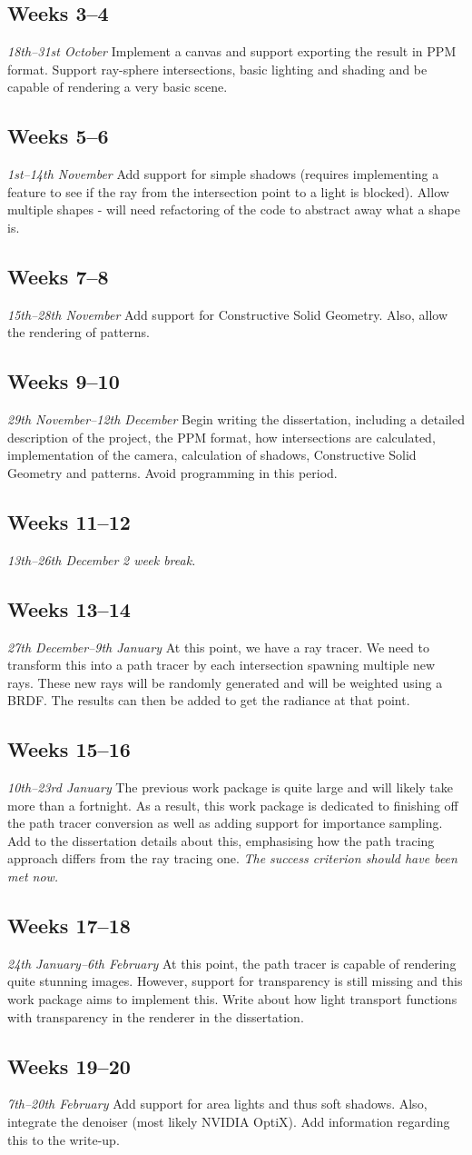 \documentclass[12pt, a4paper]{article}
\newcommand{\newtime}[3]{
    \subsection*{#1}
    \vspace{-\baselineskip}
    \emph{#2}
    \vspace{\baselineskip}
    \newline
    #3
}
\begin{document}
    \newtime{Weeks 3--4}{18th--31st October}{Implement a canvas and support exporting the result in PPM format. Support ray-sphere intersections, basic lighting and shading and be capable of rendering a very basic scene.}

    \newtime{Weeks 5--6}{1st--14th November}{Add support for simple shadows (requires implementing a feature to see if the ray from the intersection point to a light is blocked). Allow multiple shapes - will need refactoring of the code to abstract away what a shape is.}

    \newtime{Weeks 7--8}{15th--28th November}{Add support for Constructive Solid Geometry. Also, allow the rendering of patterns.}

    \newtime{Weeks 9--10}{29th November--12th December}{Begin writing the dissertation, including a detailed description of the project, the PPM format, how intersections are calculated, implementation of the camera, calculation of shadows, Constructive Solid Geometry and patterns. Avoid programming in this period.}

    \newtime{Weeks 11--12}{13th--26th December}{\emph{2 week break.}}

    \newtime{Weeks 13--14}{27th December--9th January}{At this point, we have a ray tracer. We need to transform this into a path tracer by each intersection spawning multiple new rays. These new rays will be randomly generated and will be weighted using a BRDF. The results can then be added to get the radiance at that point.}

    \newtime{Weeks 15--16}{10th--23rd January}{The previous work package is quite large and will likely take more than a fortnight. As a result, this work package is dedicated to finishing off the path tracer conversion as well as adding support for importance sampling. Add to the dissertation details about this, emphasising how the path tracing approach differs from the ray tracing one. \emph{The success criterion should have been met now.}}

    \newtime{Weeks 17--18}{24th January--6th February}{At this point, the path tracer is capable of rendering quite stunning images. However, support for transparency is still missing and this work package aims to implement this. Write about how light transport functions with transparency in the renderer in the dissertation.}

    \newtime{Weeks 19--20}{7th--20th February}{Add support for area lights and thus soft shadows. Also, integrate the denoiser (most likely NVIDIA OptiX). Add information regarding this to the write-up.}
\end{document}
